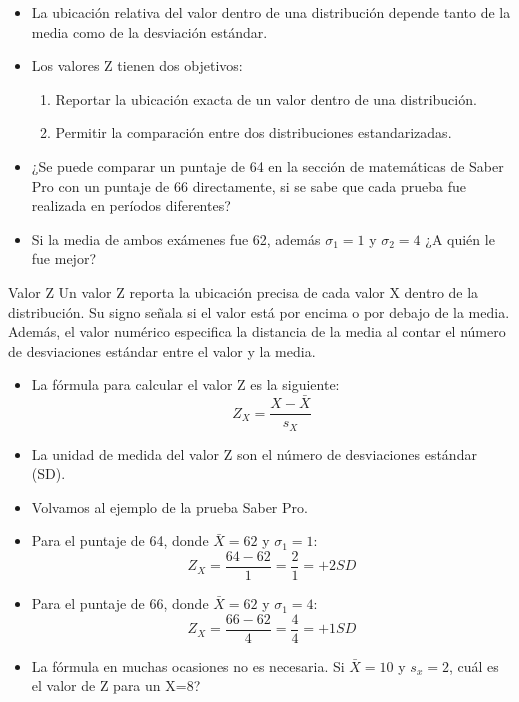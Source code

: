 \documentclass[xcolor=dvipsnames]{beamer}
\begin{document}
\begin{frame}
\begin{itemize}
\justifying
\item La ubicación relativa del valor dentro de una distribución depende tanto de la media como de la desviación estándar.
\item Los valores Z tienen dos objetivos:
\begin{enumerate}
	\justifying
\item Reportar la ubicación exacta de un valor dentro de una distribución.
\item Permitir la comparación entre dos distribuciones estandarizadas. 
\end{enumerate}
\item ¿Se puede comparar un puntaje de 64 en la sección de matemáticas de Saber Pro con un puntaje de 66 directamente, si se sabe que cada prueba fue realizada en períodos diferentes?
\item Si la media de ambos exámenes fue 62, además $\sigma_1=1$ y $\sigma_2=4$ ¿A quién le fue mejor?

\end{itemize}
\end{frame}

\begin{frame}
	\begin{center}
	\begin{block}{Valor Z}
		\justifying
		Un valor Z reporta la ubicación precisa de cada valor X dentro de la distribución. Su signo señala si el valor está por encima o por debajo de la media. Además, el valor numérico especifica la distancia de la media al contar el número de desviaciones estándar entre el valor y la media.
	\end{block}
		\end{center}
\begin{itemize}
\justifying
\item La fórmula para calcular el valor Z es la siguiente:
$$Z_X=\dfrac{X-\bar{X}}{s_X}$$
\item La unidad de medida del valor Z son el número de desviaciones estándar (SD).
\end{itemize}
\end{frame}

\begin{frame}
\begin{itemize}
\justifying
\item Volvamos al ejemplo de la prueba Saber Pro.
\item Para el puntaje de 64, donde $\bar{X}=62$ y $\sigma_1=1$:
$$Z_X=\dfrac{64-62}{1}=\dfrac{2}{1}=+2 SD$$
\item Para el puntaje de 66, donde $\bar{X}=62$ y $\sigma_1=4$:
$$Z_X=\dfrac{66-62}{4}=\dfrac{4}{4}=+1 SD$$
\item La fórmula en muchas ocasiones no es necesaria. Si $\bar{X}=10$ y $s_x=2$, cuál es el valor de Z para un X=8?
\end{itemize}

\end{frame}
\end{document}

